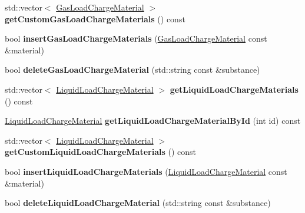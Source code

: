 \begin{DoxyCompactItemize}
\item 
\mbox{\label{class_s_q_lite_a1957d2f9ac35433b45e8511aa6889756}} 
std\+::vector$<$ \hyperlink{class_gas_load_charge_material}{Gas\+Load\+Charge\+Material} $>$ {\bfseries get\+Custom\+Gas\+Load\+Charge\+Materials} () const
\item 
\mbox{\label{class_s_q_lite_af482f51c0d3de08fbfa3e537382a567f}} 
bool {\bfseries insert\+Gas\+Load\+Charge\+Materials} (\hyperlink{class_gas_load_charge_material}{Gas\+Load\+Charge\+Material} const \&material)
\item 
\mbox{\label{class_s_q_lite_ac354a72accd5a0d8901da9df19c045d3}} 
bool {\bfseries delete\+Gas\+Load\+Charge\+Material} (std\+::string const \&substance)
\item 
\mbox{\label{class_s_q_lite_a349f65213cc1b022293bc00ba0a4c3b5}} 
std\+::vector$<$ \hyperlink{class_liquid_load_charge_material}{Liquid\+Load\+Charge\+Material} $>$ {\bfseries get\+Liquid\+Load\+Charge\+Materials} () const
\item 
\mbox{\label{class_s_q_lite_a3f31756b0fc49be7123e7146cbb12c70}} 
\hyperlink{class_liquid_load_charge_material}{Liquid\+Load\+Charge\+Material} {\bfseries get\+Liquid\+Load\+Charge\+Material\+By\+Id} (int id) const
\item 
\mbox{\label{class_s_q_lite_a1a252d50bc2e861325f120a814fddd37}} 
std\+::vector$<$ \hyperlink{class_liquid_load_charge_material}{Liquid\+Load\+Charge\+Material} $>$ {\bfseries get\+Custom\+Liquid\+Load\+Charge\+Materials} () const
\item 
\mbox{\label{class_s_q_lite_aff9ccdb8af003d3a0a3fdc9a85af77d8}} 
bool {\bfseries insert\+Liquid\+Load\+Charge\+Materials} (\hyperlink{class_liquid_load_charge_material}{Liquid\+Load\+Charge\+Material} const \&material)
\item 
\mbox{\label{class_s_q_lite_a4dbd677be8b79a0f85018fa1bed3c1db}} 
bool {\bfseries delete\+Liquid\+Load\+Charge\+Material} (std\+::string const \&substance)
\item 
\mbox{\label{class_s_q_lite_aecba5bffe035af787b17b5bf5997d825}} 

\end{DoxyCompactItemize}
